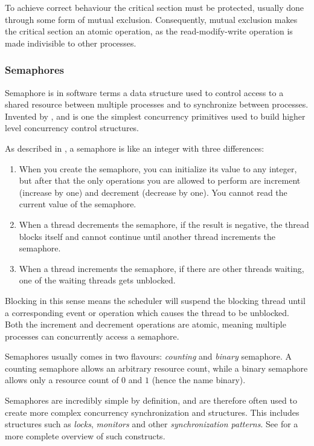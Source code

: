 To achieve correct behaviour the critical section must be protected, usually done through some form of mutual exclusion. Consequently, mutual exclusion makes the critical section an atomic operation, as the read\hyp{}modify\hyp{}write operation is made indivisible to other processes.


\subsubsection{Semaphores}


Semaphore is in software terms a data structure used to control access to a shared resource between multiple processes and to synchronize between processes. Invented by \citet{dijkstra}, and is one the simplest concurrency primitives used to build higher level concurrency control structures.

As described in \citet[chapter 2]{downey2016}, a semaphore is like an integer with three differences:

\begin{enumerate}[topsep=0em,itemsep=-1em,partopsep=0.5em,parsep=1em]
    \item When you create the semaphore, you can initialize its value to any integer, but after that the only operations you are allowed to perform are increment (increase by one) and decrement (decrease by one). You cannot read the current value of the semaphore.
    \item When a thread decrements the semaphore, if the result is negative, the thread blocks itself and cannot continue until another thread increments the semaphore.
    \item When a thread increments the semaphore, if there are other threads waiting, one of the waiting threads gets unblocked.
\end{enumerate}

Blocking in this sense means the scheduler will suspend the blocking thread until a corresponding event or operation which causes the thread to be unblocked. Both the increment and decrement operations are atomic, meaning multiple processes can concurrently access a semaphore.

Semaphores usually comes in two flavours: \textit{counting} and \textit{binary} semaphore. A counting semaphore allows an arbitrary resource count, while a binary semaphore allows only a resource count of $0$ and $1$ (hence the name binary). 

Semaphores are incredibly simple by definition, and are therefore often used to create more complex concurrency synchronization and structures. This includes structures such as \textit{locks}, \textit{monitors} and other \textit{synchronization patterns}. See \citet[chap. 3-7]{downey2016} for a more complete overview of such constructs.


